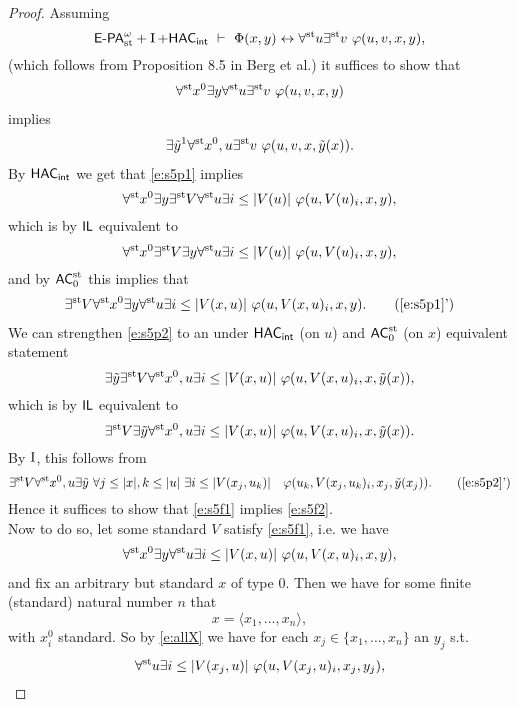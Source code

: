 \begin{proof}
Assuming \[{\textsf{\upshape E-PA}}^\omega_{\operatorname{st}{}}\!+\operatorname{I}+{\textsf{\upshape HAC}}_{{\textsf{\upshape int}}}\ \vdash\  \Phi(x,y) \leftrightarrow \forall^{\operatorname{st}{}}\! u\exists^{\operatorname{st}{}}\! v\ \varphi(u,v,x,y),\]
(which follows from Proposition 8.5 in Berg et al.) it suffices to show that
\begin{align}
\forall^{\operatorname{st}{}}\! x^0\exists y\forall^{\operatorname{st}{}}\! u\exists^{\operatorname{st}{}}\! v\ \varphi(u,v,x,y) \label{e:s5p1}
\end{align}
implies
\begin{align}
\exists \tilde y^1\forall^{\operatorname{st}{}}\! x^0,u\exists^{\operatorname{st}{}}\! v\ \varphi(u,v,x,\tilde y(x)) \label{e:s5p2}.
\end{align}
By ${\textsf{\upshape HAC}}_{{\textsf{\upshape int}}}$ we get that \eqref{e:s5p1} implies
\[
\forall^{\operatorname{st}{}}\! x^0\exists y\exists^{\operatorname{st}{}}\! V\forall^{\operatorname{st}{}}\! u\exists i\leq |V(u)|\ \varphi(u,V(u)_i,x,y),
\]
which is by $\textsf{\upshape IL}$ equivalent to
\[
\forall^{\operatorname{st}{}}\! x^0\exists^{\operatorname{st}{}}\! V\exists y\forall^{\operatorname{st}{}}\! u\exists i\leq |V(u)|\ \varphi(u,V(u)_i,x,y),
\]
and by $\textsf{\upshape AC}_0^{\operatorname{st}}$ this implies that
\begin{align*}
\existsst V\forallst x^0\exists y\forallst u\exists i\leq |V(x,u)|\ \phi(u,V(x,u)_i,x,y). \tag{\ref{e:s5p1}'}\label{e:s5f1}
\end{align*}
We can strengthen \eqref{e:s5p2} to an under ${\textsf{\upshape HAC}}_{{\textsf{\upshape int}}}$ (on $u$) and $\textsf{\upshape AC}_0^{\operatorname{st}}$ (on $x$) equivalent statement
\[
\exists \tilde y\exists^{\operatorname{st}{}}\! V \forall^{\operatorname{st}{}}\! x^0,u\exists i\leq |V(x,u)|\ \varphi(u,V(x,u)_i,x,\tilde y(x)),
\]
which is by $\textsf{\upshape IL}$ equivalent to
\[
\exists^{\operatorname{st}{}}\! V \exists \tilde y\forall^{\operatorname{st}{}}\! x^0,u\exists i\leq |V(x,u)|\ \varphi(u,V(x,u)_i,x,\tilde y(x)). 
\]
By $\operatorname{I}$, this follows from
\[
\existsst V \forallst x^0,u\exists \tilde y\ \forall j\leq |x|,k\leq |u|\ \exists i\leq |V(x_j,u_k)|\quad \phi(u_k,V(x_j,u_k)_i,x_j,\tilde y(x_j)).
 \tag{\ref{e:s5p2}'}\label{e:s5f2}
\]
Hence it suffices to show that \eqref{e:s5f1} implies \eqref{e:s5f2}.\\
Now to do so, let some standard $V$ satisfy \eqref{e:s5f1}, i.e. we have 
\begin{align}
\forall^{\operatorname{st}{}}\! x^0\exists y\forall^{\operatorname{st}{}}\! u\exists i\leq |V(x,u)|\ \varphi(u,V(x,u)_i,x,y), \label{e:allX}
\end{align}
and fix an arbitrary but standard $x$ of type $0$. Then we have for some finite (standard) natural number $n$ that
\[
x = \langle x_1,\ldots,x_n \rangle,
\]
with $x_i^0$ standard. So by \eqref{e:allX} we have for each $x_j\in\{x_1,\ldots,x_n\}$ an $y_j$ s.t.
\[
\forall^{\operatorname{st}{}}\! u\exists i\leq |V(x_j,u)|\ \varphi(u,V(x_j,u)_i,x_j,y_j), 
\]
\end{proof}
